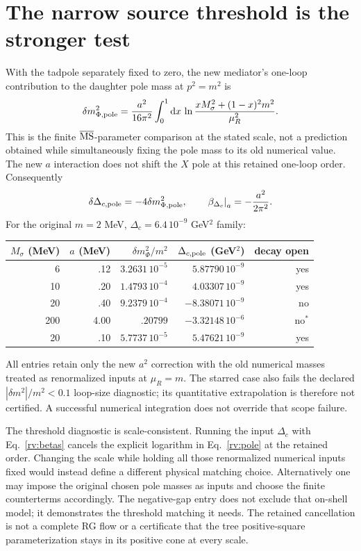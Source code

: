 \documentclass[11pt]{article}
\newcommand{\dd}{\mathrm d}
\begin{document}
\section{The narrow source threshold is the stronger test}
With the tadpole separately fixed to zero, the new mediator's one-loop
contribution to the daughter pole mass at $p^2=m^2$ is
\begin{equation}
 \delta m_{\Phi,\rm pole}^2
 ={a^2\over16\pi^2}\int_0^1\dd x\,
       \ln{xM_\sigma^2+(1-x)^2m^2\over\mu_R^2}.
 \label{rv:pole}
\end{equation}
This is the finite $\overline{\rm MS}$-parameter comparison at the stated
scale, not a prediction obtained while simultaneously fixing the pole mass
to its old numerical value. The new $a$ interaction does not shift the
$X$ pole at this retained one-loop order. Consequently
\begin{equation}
 \delta\Delta_{c,\rm pole}=-4\delta m_{\Phi,\rm pole}^2,
 \qquad
 \left.\beta_{\Delta_c}\right|_a=-{a^2\over2\pi^2}.
\end{equation}
For the original $m=2$ MeV, $\Delta_c=6.4\,10^{-9}$ GeV$^2$ family:
\begin{center}
\begin{tabular}{rrrrr}
\toprule
$M_\sigma$ (MeV)&$a$ (MeV)&$\delta m_\Phi^2/m^2$
 &$\Delta_{c,\rm pole}$ (GeV$^2$)&decay open\\
\midrule
6 & .12 & $3.2631\,10^{-5}$ & $5.87790\,10^{-9}$ & yes\\
10 & .20 & $1.4793\,10^{-4}$ & $4.03307\,10^{-9}$ & yes\\
20 & .40 & $9.2379\,10^{-4}$ & $-8.38071\,10^{-9}$ & no\\
200 & 4.00 & $.20799$ & $-3.32148\,10^{-6}$ & no$^*$\\
20 & .10 & $5.7737\,10^{-5}$ & $5.47621\,10^{-9}$ & yes\\
\bottomrule
\end{tabular}
\end{center}
All entries retain only the new $a^2$ correction with the old numerical
masses treated as renormalized inputs at $\mu_R=m$. The starred case also
fails the declared $|\delta m^2|/m^2<0.1$ loop-size diagnostic; its
quantitative extrapolation is therefore not certified. A successful
numerical integration does not override that scope failure.

The threshold diagnostic is scale-consistent. Running the input
$\Delta_c$ with Eq.~\eqref{rv:betas} cancels the explicit logarithm in
Eq.~\eqref{rv:pole} at the retained order. Changing the scale while
holding all those renormalized numerical inputs fixed would instead define
a different physical matching choice. Alternatively one may impose the
original chosen pole masses as inputs and choose the finite counterterms
accordingly. The negative-gap entry does not exclude that on-shell model;
it demonstrates the threshold matching it needs.
The retained cancellation is not a complete RG flow or a certificate that
the tree positive-square parameterization stays in its positive cone at
every scale.
\end{document}
